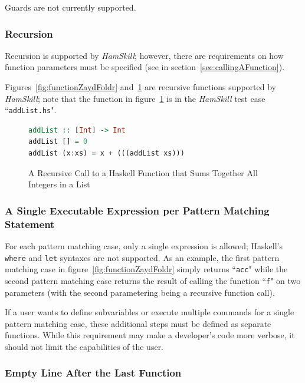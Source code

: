 \documentclass{report}
\begin{document}
Guards are not currently supported.


\subsubsection{Recursion}

Recursion is supported by \textit{HamSkill}; however, there are requirements on how function parameters must be specified (see in section~\ref{sec:callingAFunction}).

Figures~\ref{fig:functionZaydFoldr} and~\ref{fig:functionAddList} are recursive functions supported by \textit{HamSkill}; note that the function in figure~\ref{fig:functionAddList} is in the \textit{HamSkill} test case ``\texttt{addList.hs}".

\begin{figure}[H]
\begin{mdframed}
\begin{lstlisting}[language=Haskell]
addList :: [Int] -> Int
addList [] = 0
addList (x:xs) = x + (((addList xs)))
\end{lstlisting}
\end{mdframed}
\caption{A Recursive Call to a Haskell Function that Sums Together All Integers in a List}\label{fig:functionAddList}
\end{figure}

\subsubsection{A Single Executable Expression per Pattern Matching Statement}

For each pattern matching case, only a single expression is allowed; Haskell's \texttt{where} and \texttt{let} syntaxes are not supported.  As an example, the first pattern matching case in figure~\ref{fig:functionZaydFoldr} simply returns ``\texttt{acc}" while the second pattern matching case returns the result of calling the function ``\texttt{f}" on two parameters (with the second parametering being a recursive function call).

If a user wants to define subvariables or execute multiple commands for a single pattern matching case, these additional steps must be defined as separate functions.  While this requirement may make a developer's code more verbose, it should not limit the capabilities of the user.

\subsubsection{Empty Line After the Last Function}
\end{document}
